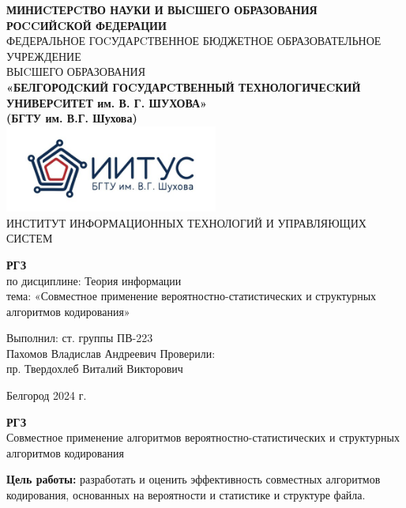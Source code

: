\documentclass[a4paper,14pt]{extarticle}
\newcommand\textbox[1]{
	\parbox{.45\textwidth}{#1}
}
\begin{document}
\begin{center}
    \small{
        \textbf{МИНИCТЕРCТВО НАУКИ И ВЫCШЕГО ОБРАЗОВАНИЯ РОCCИЙCКОЙ ФЕДЕРАЦИИ}\\
        ФЕДЕРАЛЬНОЕ ГОCУДАРCТВЕННОЕ БЮДЖЕТНОЕ ОБРАЗОВАТЕЛЬНОЕ УЧРЕЖДЕНИЕ\\ВЫCШЕГО ОБРАЗОВАНИЯ \\
        \textbf{«БЕЛГОРОДCКИЙ ГОCУДАРCТВЕННЫЙ ТЕХНОЛОГИЧЕCКИЙ\\УНИВЕРCИТЕТ им. В. Г. ШУХОВА»\\ (БГТУ им. В.Г. Шухова)} \\
        \bigbreak
        \includegraphics[width=70mm]{log}\\
        ИНСТИТУТ ИНФОРМАЦИОННЫХ ТЕХНОЛОГИЙ И УПРАВЛЯЮЩИХ СИСТЕМ\\}
\end{center}

\vfill
\begin{center}
    \large{
        \textbf{
            РГЗ}}\\
    \normalsize{
        по дисциплине: Теория информации \\
        тема: «Совместное применение вероятностно-статистических и структурных алгоритмов кодирования»}
\end{center}
\vfill
\hfill\textbox{
    Выполнил: ст. группы ПВ-223\\Пахомов Владислав Андреевич
    \bigbreak
    Проверили: \\пр. Твердохлеб Виталий Викторович
}
\vfill\begin{center}
    Белгород 2024 г.
\end{center}
\newpage
\begin{center}
    \textbf{РГЗ}\\
    Совместное применение алгоритмов вероятностно-статистических и структурных алгоритмов кодирования\\
\end{center}
\textbf{Цель работы: }разработать и оценить эффективность совместных алгоритмов кодирования,
основанных на вероятности и статистике и структуре файла. \\
\end{document}
